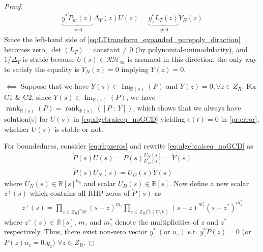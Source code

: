 \documentclass[journal]{IEEEtran}
\theoremstyle{remark}
\DeclareMathOperator*{\rank}{rank}
\DeclareMathOperator*{\im}{Im}
\begin{document}
\begin{proof}
\begin{align} 
\label{eq:LTtransform_expanded_purepoly_diraction}
\underbrace{y^*_z\grave{P}_m(z)}_{=0}\Delta_Y(z)U(z)=\underbrace{y^*_zL_T(z)}_{\ne 0}\grave{Y}_N(z)
\end{align}
Since the left-hand side of \eqref{eq:LTtransform_expanded_purepoly_diraction} becomes zero, $\det(L_T) = \text{constant} \ne 0$ (by polynomial-unimodularity), and $1/\Delta_Y$ is stable because $U(s) \in \mathcal{RH}_\infty$ is assumed in this direction, the only way to satisfy the equality is $\grave{Y}_N(z)=0$ implying $Y(z)=0$. 

$\impliedby$ Suppose that we have $Y(s) \in \im_{\mathbb{R}(s)}(P)$ and $Y(z)=0, \forall z \in Z_R$. For C1 \& C2, since $Y(s) \in \im_{\mathbb{R}(s)}(P)$, we have $\rank_{\mathbb{R}(s)}(P)=\rank_{\mathbb{R}(s)}([P\ : \ Y])$, which shows that we always have solution(s) for $U(s)$ in \eqref{eq:algebraiceq_noGCD} yielding $e(t)=0$ in \eqref{pr:error}, whether $U(s)$ is stable or not.

For boundedness, consider \eqref{eq:rhpzeros} and rewrite \eqref{eq:algebraiceq_noGCD} as 
\begin{align} \label{eq:algebraiceq_noGCD_Ufactored}
    \grave{P}(s)U(s) = \grave{P}(s)\frac{U_N(s)}{U_D(s)} = \grave{Y}(s) \\
    \grave{P}(s)U_N(s)=U_D(s)\grave{Y}(s) \label{eq:algebraiceq_noGCD_Ufactored2}
\end{align}
where $U_N(s) \in \mathbb{R}[s]^{n_u}$ and scalar $U_D(s) \in \mathbb{R}[s]$. Now define a new scalar $z^+(s)$ which contains all RHP zeros of $\grave{P}(s)$ as
 \begin{align*} 
    z^+(s)=\prod_{z \in Z_R \bigcap \mathbb{R}}(s - z)^{m_z}\prod_{z \in Z_R\bigcap (\mathbb{C}\setminus \mathbb{R})}(s - z)^{m_z^\ast} (s - {z}^\ast)^{m_z^\ast}
\end{align*} 
where $z^+(s) \in \mathbb{R}[s]$, $m_z$ and $m_z^\ast$ denote the multiplicities of $z$ and ${z}^*$ respectively. Thus, there exist non-zero vector $y^\ast_z \ (\text{or } u_z)$ s.t. $y^\ast_z\grave{P}(z)=0 $ (or $ \grave{P}(z)u_z=0.y_z$) $\forall z \in Z_R$. 


\end{proof}
\end{document}
